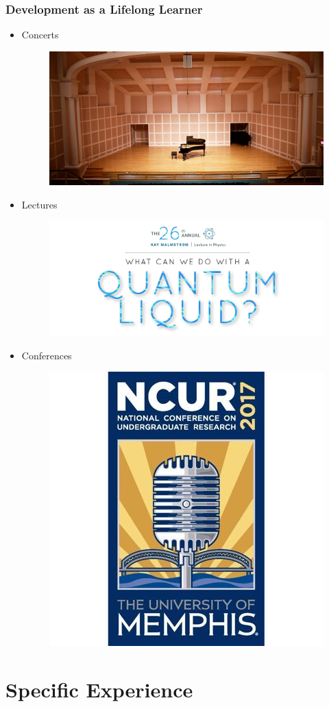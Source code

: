\documentclass{beamer}
\begin{document}
\begin{frame}
\frametitle{Development as a Lifelong Learner}
\begin{itemize}
	\item Concerts
	\begin{figure}[htp]
		\includegraphics[width=0.3\linewidth]{images/Sundin.jpg}
	\end{figure}
	\item Lectures
	\begin{figure}[htp]
		\includegraphics[width=0.7\linewidth]{images/Malmstrom.jpg}
	\end{figure}
	\item Conferences
	\begin{figure}
		\includegraphics[width=0.2\linewidth]{images/NCUR.jpg}
	\end{figure}
\end{itemize}
\end{frame}

\section{Specific Experience}
\end{document}
